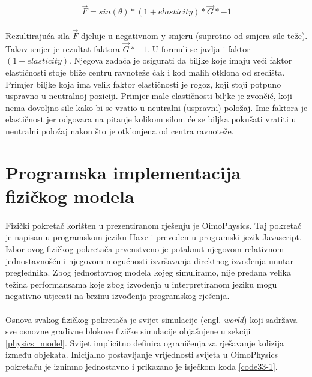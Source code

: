 \documentclass[times, utf8, diplomski]{fer}
\begin{document}
\begin{equation}
\vec{F} = sin(\theta) * (1 + elasticity) * \vec{G} * -1
\label{eq:32-2}
\end{equation}

\paragraph{}
Rezultirajuća sila $\vec{F}$ djeluje u negativnom y smjeru (suprotno od smjera sile teže).
Takav smjer je rezultat faktora $\vec{G} * -1$. U formuli se javlja i faktor $(1 + 
elasticity)$. Njegova zadaća je osigurati da biljke koje imaju veći faktor elastičnosti 
stoje bliže centru ravnoteže čak i kod malih otklona od središta. Primjer biljke koja ima 
velik faktor elastičnosti je rogoz, koji stoji potpuno uspravno u neutralnoj poziciji. 
Primjer male elastičnosti biljke je zvončić, koji nema dovoljno sile kako bi se vratio u 
neutralni (uspravni) položaj. Ime faktora je elastičnost jer odgovara na pitanje kolikom 
silom će se biljka pokušati vratiti u neutralni položaj nakon što je otklonjena od centra 
ravnoteže.

\section{Programska implementacija fizičkog modela}
\paragraph{}
Fizički pokretač korišten u prezentiranom rješenju je OimoPhysics. Taj pokretač je napisan
u programskom jeziku Haxe i preveden u programski jezik Javascript. Izbor ovog fizičkog 
pokretača prvenstveno je potaknut njegovom relativnom jednostavnošću i njegovom mogućnosti 
izvršavanja direktnog izvođenja unutar preglednika. Zbog jednostavnog modela kojeg 
simuliramo, nije predana velika težina performansama koje zbog izvođenja u interpretiranom
jeziku mogu negativno utjecati na brzinu izvođenja programskog rješenja.

\paragraph{}
Osnova svakog fizičkog pokretača je svijet simulacije (engl. \textit{world}) koji sadržava 
sve osnovne gradivne blokove fizičke simulacije objašnjene u sekciji \ref{physics_model}.
Svijet implicitno definira ograničenja za rješavanje kolizija između objekata. Inicijalno
postavljanje vrijednosti svijeta u OimoPhysics pokretaču je iznimno jednostavno i prikazano je isječkom koda \ref{code33-1}.
\end{document}

